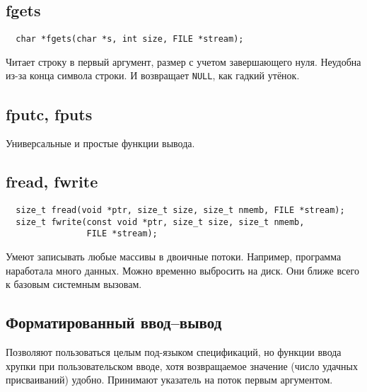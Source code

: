 \documentclass{article}
\begin{document}
\subsection{fgets}
\begin{lstlisting}
  char *fgets(char *s, int size, FILE *stream);
\end{lstlisting}

Читает строку в первый аргумент, размер с учетом завершающего
нуля. Неудобна из-за конца символа строки. И возвращает
\lstinline{NULL}, как гадкий утёнок.

\subsection{fputc, fputs}
Универсальные и простые функции вывода.
\subsection{fread, fwrite}
\begin{lstlisting}
  size_t fread(void *ptr, size_t size, size_t nmemb, FILE *stream);
  size_t fwrite(const void *ptr, size_t size, size_t nmemb,
                FILE *stream);
\end{lstlisting}
Умеют записывать любые массивы в двоичные потоки. Например, программа
наработала много данных. Можно временно выбросить на диск. Они ближе
всего к базовым системным вызовам.

\subsection{Форматированный ввод--вывод}
Позволяют пользоваться целым под-языком спецификаций, но функции ввода
хрупки при пользовательском вводе, хотя возвращаемое значение (число
удачных присваиваний) удобно. Принимают указатель на поток первым
аргументом.
\end{document}
